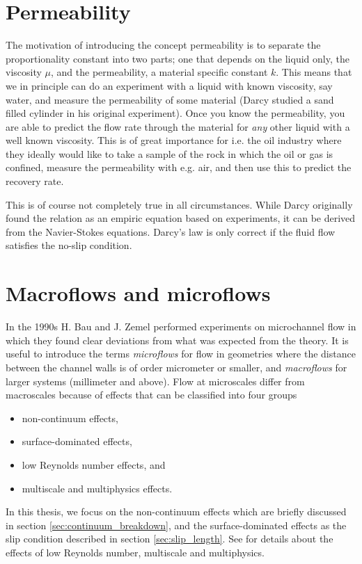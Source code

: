 \section{Permeability}
\label{sec:permeability}
The motivation of introducing the concept permeability is to separate the proportionality constant into two parts; one that depends on the liquid only, the viscosity $\mu$, and the permeability, a material specific constant $k$. This means that we in principle can do an experiment with a liquid with known viscosity, say water, and measure the permeability of some material (Darcy studied a sand filled cylinder in his original experiment). Once you know the permeability, you are able to predict the flow rate through the material for \textit{any} other liquid with a well known viscosity. This is of great importance for i.e. the oil industry where they ideally would like to take a sample of the rock in which the oil or gas is confined, measure the permeability with e.g. air, and then use this to predict the recovery rate.

This is of course not completely true in all circumstances. While Darcy originally found the relation as an empiric equation based on experiments, it can be derived from the Navier-Stokes equations. Darcy's law is only correct if the fluid flow satisfies the no-slip condition.
\section{Macroflows and microflows}
\label{sec:theory_of_fluids_microflows}
In the 1990s H. Bau and J. Zemel performed experiments on microchannel flow in which they found clear deviations from what was expected from the theory\cite{karniadakis2005microflows}. It is useful to introduce the terms \textit{microflows} for flow in geometries where the distance between the channel walls is of order micrometer or smaller, and \textit{macroflows} for larger systems (millimeter and above). Flow at microscales differ from macroscales because of effects that can be classified into four groups
\begin{itemize}
\item non-continuum effects,
\item surface-dominated effects,
\item low Reynolds number effects, and
\item multiscale and multiphysics effects.
\end{itemize}
In this thesis, we focus on the non-continuum effects which are briefly discussed in section \ref{sec:continuum_breakdown}, and the surface-dominated effects as the slip condition described in section \ref{sec:slip_length}. See \cite{karniadakis2005microflows} for details about the effects of low Reynolds number, multiscale and multiphysics. 

